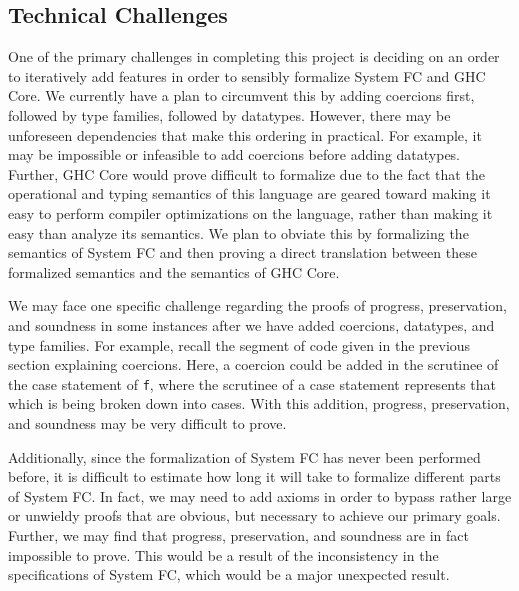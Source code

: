 \documentclass{sig-alternate}
\begin{document}
\subsection{Technical Challenges}
\label{subsec:tech_challenges}
One of the primary challenges in completing this project is deciding on an order to iteratively add features in order to sensibly formalize System FC and GHC Core. We currently have a plan to circumvent this by adding coercions first, followed by type families, followed by datatypes. However, there may be unforeseen dependencies that make this ordering in practical. For example, it may be impossible or infeasible to add coercions before adding datatypes. Further, GHC Core would prove difficult to formalize due to the fact that the operational and typing semantics of this language are geared toward making it easy to perform compiler optimizations on the language, rather than making it easy than analyze its semantics. We plan to obviate this by formalizing the semantics of System FC and then proving a direct translation between these formalized semantics and the semantics of GHC Core.

We may face one specific challenge regarding the proofs of progress, preservation, and soundness in some instances after we have added coercions, datatypes, and type families. For example, recall the segment of code given in the previous section explaining coercions. Here, a coercion could be added in the scrutinee of the case statement of \texttt{f}, where the scrutinee of a case statement represents that which is being broken down into cases. With this addition, progress, preservation, and soundness may be very difficult to prove.

Additionally, since the formalization of System FC has never been performed before, it is difficult to estimate how long it will take to formalize different parts of System FC. In fact, we may need to add axioms in order to bypass rather large or unwieldy proofs that are obvious, but necessary to achieve our primary goals. Further, we may find that progress, preservation, and soundness are in fact impossible to prove. This would be a result of the inconsistency in the specifications of System FC, which would be a major unexpected result.
\end{document}
